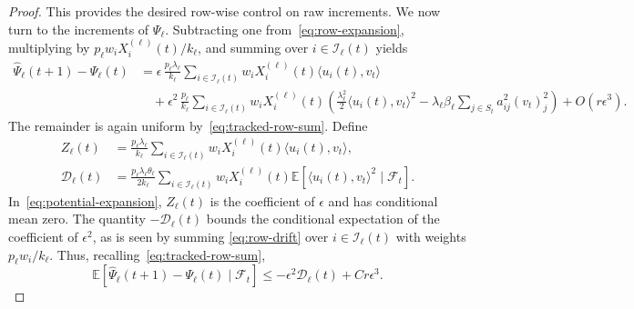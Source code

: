\documentclass[reqno]{amsart}
\theoremstyle{definition}
\newcommand{\E}{\mathbb E}
\newcommand{\ip}[2]{\langle#1,#2\rangle}
\begin{document}
\begin{proof}
This provides the desired row-wise control on raw increments. We now turn to the increments of $\Psi_\ell$. Subtracting one from~\eqref{eq:row-expansion}, multiplying by $p_\ell w_iX_i^{(\ell)}(t)/k_\ell$, and summing over $i\in\mathcal I_\ell(t)$ yields
\begingroup
\begin{equation}\label{eq:potential-expansion}
\begin{aligned}
  \widehat\Psi_\ell(t+1)-\Psi_\ell(t) &=\epsilon\,\frac{p_\ell\lambda_\ell}{k_\ell} \sum_{i\in\mathcal I_\ell(t)} w_iX_i^{(\ell)}(t)\ip{u_i(t)}{v_t}\\
  &\quad+\epsilon^2\,\frac{p_\ell}{k_\ell} \sum_{i\in\mathcal I_\ell(t)} w_iX_i^{(\ell)}(t) \left( \frac{\lambda_\ell^2}{2}\ip{u_i(t)}{v_t}^2 -\lambda_\ell\beta_\ell \sum_{j\in S_t}a_{ij}^2(v_t)_j^2 \right) +O(r\epsilon^3).
\end{aligned}
\end{equation}
\endgroup
The remainder is again uniform  by~\eqref{eq:tracked-row-sum}. Define
\begin{equation}\label{eq:drift}
\begin{aligned}
  Z_\ell(t) &=\frac{p_\ell\lambda_\ell}{k_\ell} \sum_{i\in\mathcal I_\ell(t)} w_iX_i^{(\ell)}(t)\ip{u_i(t)}{v_t},\\
  \mathcal D_\ell(t) &=\frac{p_\ell\lambda_\ell\theta_\ell}{2k_\ell} \sum_{i\in\mathcal I_\ell(t)} w_iX_i^{(\ell)}(t) \E[\ip{u_i(t)}{v_t}^2\mid\mathcal F_t].
\end{aligned}
\end{equation}
In~\eqref{eq:potential-expansion}, $Z_\ell(t)$ is the coefficient of $\epsilon$ and has conditional mean zero. The quantity $-\mathcal D_\ell(t)$ bounds the conditional expectation of the coefficient of $\epsilon^2$, as is seen by summing \eqref{eq:row-drift} over $i\in\mathcal I_\ell(t)$ with weights $p_\ell w_i/k_\ell$. Thus, recalling~\eqref{eq:tracked-row-sum},
\begingroup
\begin{equation}\label{eq:potential-drift} \E[\widehat\Psi_\ell(t+1)-\Psi_\ell(t)\mid\mathcal F_t] \le-\epsilon^2\mathcal D_\ell(t)+Cr\epsilon^3. \end{equation}
\endgroup


\end{proof}
\end{document}
